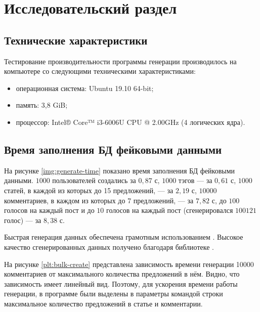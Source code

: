 \chapter{Исследовательский раздел}

\section{Технические характеристики}

Тестирование производительности программы генерации производилось на компьютере со следующими техническими характеристиками:
\begin{itemize}
	\item операционная система: Ubuntu 19.10 64-bit;
	\item память: 3,8 GiB;
	\item процессор: Intel® Core™ i3-6006U CPU @ 2.00GHz (4 логических ядра).
\end{itemize}

\section{Время заполнения БД фейковыми данными}

На рисунке \ref{img:generate-time} показано время заполнения БД фейковыми данными.
$1000$ пользователей создались за $0,87$ с, $1000$ тэгов — за $0,61$ с, $1000$ статей, в каждой из которых до 15 предложений, — за $2,19$ с, $10000$ комментариев, в каждом из которых до 7 предложений, — за $7,82$ с, до $100$ голосов на каждый пост и до $10$ голосов на каждый пост (сгенерировался $100121$ голос) — за $8,38$ с.

Быстрая генерация данных обеспечена грамотным использованием .
Высокое качество сгенерированных данных получено благодаря библиотеке  \cite{faker}.

На рисунке \ref{plt:bulk-create} представлена зависимость времени генерации 10000 комментариев от максимального количества предложений в нём.
Видно, что зависимость имеет линейный вид.
Поэтому, для ускорения времени работы генерации, в программе были выделены в параметры командой строки максимальное количество предложений в статье и комментарии.

